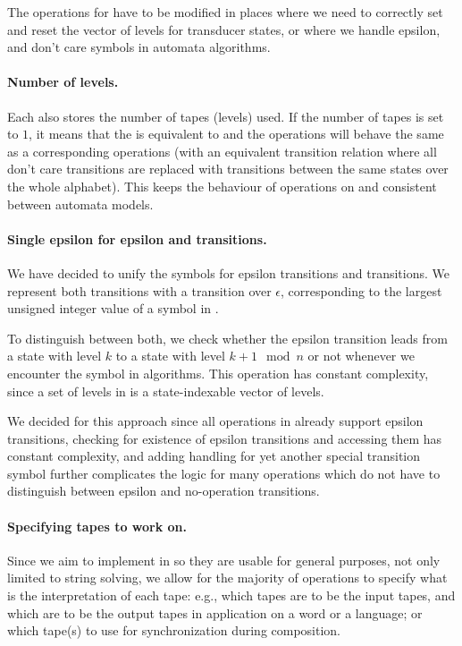 The \nfa operations for \nfts have to be modified in places where we need to correctly set and reset the vector of levels for transducer states, or where we handle epsilon, \nop and don't care symbols in automata algorithms.

\paragraph{Number of levels.}
Each \nft also stores the number of tapes (levels) used.
If the number of tapes is set to $1$, it means that the \nft is equivalent to \nfa and the \nft operations will behave the same as a corresponding \nfa operations (with an equivalent transition relation where all don't care transitions are replaced with transitions between the same states over the whole alphabet).
This keeps the behaviour of operations on \nfts and \nfas consistent between automata models.

\paragraph{Single epsilon for epsilon and \nop transitions.}
We have decided to unify the symbols for epsilon transitions and \nop transitions.
We represent both transitions with a transition over $\epsilon$, corresponding to the largest unsigned integer value of a symbol in \mata.

To distinguish between both, we check whether the epsilon transition leads from a state with level $k$ to a state with level $k + 1 \mod n$ or not whenever we encounter the symbol in algorithms.
This operation has constant complexity, since a set of levels in \mata is a state-indexable vector of levels.

We decided for this approach since all operations in \mata already support epsilon transitions, checking for existence of epsilon transitions and accessing them has constant complexity, and adding handling for yet another special transition symbol further complicates the logic for many operations which do not have to distinguish between epsilon and no-operation transitions.

\paragraph{Specifying tapes to work on.}
Since we aim to implement \nfts in \mata so they are usable for general purposes, not only limited to string solving, we allow for the majority of operations to specify what is the interpretation of each tape: e.g., which tapes are to be the input tapes, and which are to be the output tapes in application on a word or a language; or which tape(s) to use for synchronization during composition.

